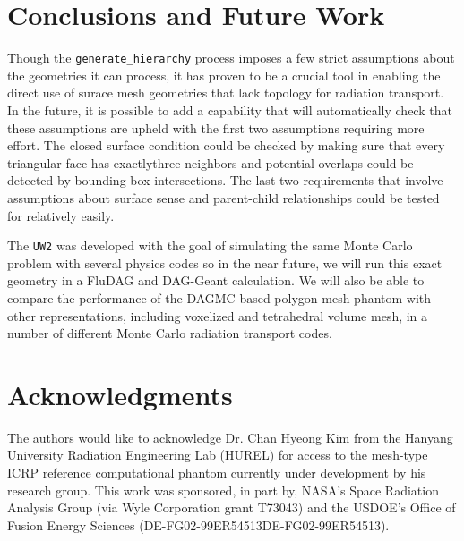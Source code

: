 \documentclass{anstrans}
\begin{document}
\section{Conclusions and Future Work}

Though the \texttt{generate\_hierarchy} process imposes a few strict assumptions
about the geometries it can process, it has proven to be a crucial tool
in enabling the direct use of surace mesh geometries that lack topology for radiation transport.
In the future, it is possible to add a capability that will automatically check that these assumptions
are upheld with the first two assumptions requiring more effort. 
The closed surface condition could be checked by making sure that every triangular face
has exactlythree neighbors and potential overlaps could be detected by bounding-box intersections.
The last two requirements that involve assumptions about surface sense and parent-child relationships
could be tested for relatively easily. 

The \texttt{UW2} was developed with the goal of simulating the same Monte
Carlo problem with several physics codes so in the near future, we will run
this exact geometry in a FluDAG and DAG-Geant calculation. We will also be
able to compare the performance of the DAGMC-based polygon mesh phantom with
other representations, including voxelized and tetrahedral volume mesh, in a
number of different Monte Carlo radiation transport codes.

\section{Acknowledgments}

The authors would like to acknowledge Dr. Chan Hyeong Kim from the Hanyang University Radiation Engineering Lab (HUREL)
for access to the mesh-type ICRP reference computational phantom currently under development by his research group.
This work was sponsored, in part by, NASA's Space Radiation Analysis Group (via Wyle Corporation grant T73043)
and the USDOE's Office of Fusion Energy Sciences (DE-FG02-99ER54513DE-FG02-99ER54513).



\end{document}
